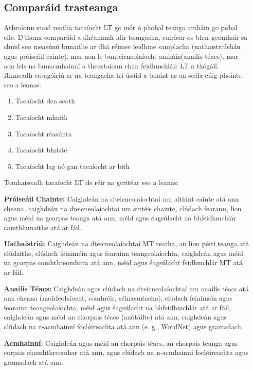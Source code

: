 \documentclass[]{../../metanetpaper}
\begin{document}
\begin{multicols}{2}
\subsection{Comparáid trasteanga}

Athraíonn staid reatha tacaíocht LT go mór ó phobal teanga amháin go pobal eile. D'fhonn comparáid a dhéanamh idir teangacha, cuirfear os bhur gcomhair sa chuid seo measúnú bunaithe ar dhá réimse feidhme samplacha (uathaistriúchán agus próiseáil cainte), mar aon le bunteicneolaíocht amháin(anailís téacs), mar aon leis na bunacmhainní a theastaíonn chun feidhmchláir LT a thógáil. Rinneadh catagóiriú ar na teangacha trí úsáid a bhaint as an scála cúig phointe seo a leanas:

\begin{enumerate} 
\item Tacaíocht den scoth
\item Tacaíocht mhaith
\item Tacaíocht réasúnta
\item Tacaíocht bhriste
\item Tacaíocht lag nó gan tacaíocht ar bith
\end{enumerate}

Tomhaiseadh tacaíocht LT de réir na gcritéar seo a leanas:

\textbf{Próiseáil Chainte:} Caighdeán na dteicneolaíochtaí um aithint cainte atá ann cheana, caighdeán na dteicneolaíochtaí um sintéis chainte, clúdach fearann, líon agus méid na gcorpas teanga atá ann, méid agus éagsúlacht na bhfeidhmchlár caintbhunaithe atá ar fáil.

\textbf{Uathaistriú:} Caighdeán na dteicneolaíochtaí MT reatha, an líon péirí teanga atá clúdaithe, clúdach feiniméin agus fearainn teangeolaíochta, caighdeán agus méid na gcorpas comhthreomhara atá ann, méid agus éagsúlacht feidhmchlár MT atá ar fáil.

\textbf{Anailís Téacs:} Caighdeán agus clúdach na dteicneolaíochtaí um anailís téacs atá ann cheana (moirfeolaíocht, comhréir, séimeantacha), clúdach feiniméin agus fearainn teangeolaíochta, méid agus éagsúlacht na bhfeidhmchlár atá ar fáil, caighdeán agus méid an chorpais téacs (anótáilte) atá ann, caighdeán agus clúdach na n-acmhainní foclóireachta atá ann (e. g., WordNet) agus gramadach.

\textbf{Acmhainní:} Caighdeán agus méid an chorpais téacs, an chorpais teanga agus corpais chomhthreomhar atá ann, agus clúdach na n-acmhainní foclóireachta agus gramadach atá ann.


\end{multicols}
\end{document}
